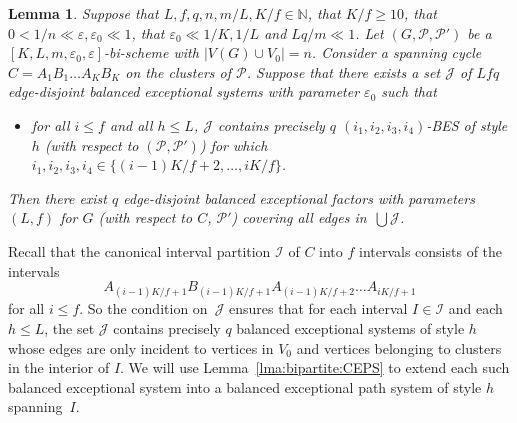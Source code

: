 \documentclass{memo-l}
\newtheorem{lemma}[firstthm]{Lemma}
\def\cP{\mathcal{P}}
\def\eps{\varepsilon}
\numberwithin{section}{chapter}
\numberwithin{equation}{section}
\numberwithin{firstthm}{section}
\numberwithin{figure}{section}
\begin{document}
{\begin{lemma} \label{lma:EF-bipartite}
Suppose that $L,f,q,n,m/L,K/f \in \mathbb{N}$, that $K/f\ge 10$, that $0 <1/n \ll \eps,\eps_0  \ll 1$,
that $\eps_0\ll 1/K,1/L$ and $Lq/m\ll 1$.
Let $(G,\mathcal{P}, \mathcal{P}')$ be a $[K, L, m,\eps_0,\eps]$-bi-scheme with $|V(G)\cup V_0|=n$.
Consider a spanning cycle $C = A_1 B_1 \dots A_K B_K$ on the clusters of $\mathcal{P}$.
Suppose that there exists a set $\mathcal{J}$ of $Lf q $ edge-disjoint balanced exceptional systems
with parameter $\eps_0$ such that 
\begin{itemize}
	\item for all $i \le f$ and all $h \le L$, $\mathcal{J}$ contains precisely $q$ $(i_1,i_2,i_3,i_4)$-BES of style $h$
(with respect to $(\cP,\cP')$) for which $i_1,i_2,i_3,i_4 \in \{ (i-1)K/f+2, \dots, iK/f \}$.
\end{itemize}
Then there exist $q$ edge-disjoint balanced exceptional factors with parameters~$(L,f)$ for $G$ (with respect to $C$, $\mathcal P'$) covering all
edges in~$\bigcup\mathcal{J}$.
\end{lemma}

Recall that the canonical interval partition $\mathcal{I}$ of $C$ into $f$ intervals consists of the intervals
$$A_{(i-1)K/f+1} B_{(i-1)K/f+1} A_{(i-1)K/f+2} \dots A_{iK/f+1}$$ for all $i\le f$. So the condition on~$\mathcal{J}$ ensures
that for each interval $I\in \mathcal{I}$ and each $h\le L$, the set $\mathcal{J}$ contains precisely $q$
balanced exceptional systems of style $h$ whose edges are only incident to vertices in $V_0$ and vertices
belonging to clusters in the interior of $I$. We will use Lemma~\ref{lma:bipartite:CEPS} to extend each such balanced exceptional system into
a balanced exceptional path system of style $h$ spanning~$I$.

}
\end{document}
